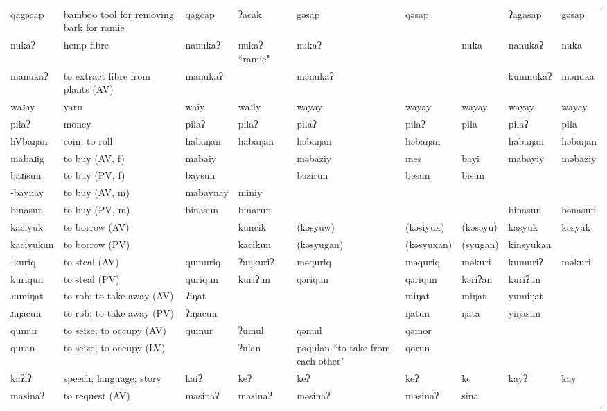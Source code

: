 \begin{landscape}
\begin{longtable}{*{9}{>{\raggedright\arraybackslash}p{}}}
\text{*}qagəcap & bamboo tool for removing bark for ramie & qagcap & ʔacak & gəsap & qəsap &  & ʔagasap & gəsap\\
\text{*}nukaʔ & hemp fibre & nanukaʔ & nukaʔ ``ramie" & nukaʔ &  & nuka & nanukaʔ & nuka\\
\text{*}manukaʔ & to extract fibre from plants (AV) & manukaʔ &  & mənukaʔ &  &  & kumnukaʔ & mənuka\\
\text{*}waɹay & yarn & waiy & waɹiy & wayay & wayay & wayay & wayay & wayay\\
\text{*}pilaʔ & money & pilaʔ & pilaʔ & pilaʔ & pilaʔ & pila & pilaʔ & pila\\
\text{*}hVbaŋan & coin; to roll & habaŋan & habaŋan & həbaŋan & həbaŋan &  & habaŋan & həbaŋan\\
\text{*}mabaɹig & to buy (AV, f) & mabaiy &  & məbaziy & mes & bayi & mabayiy & məbaziy\\
\text{*}baɹisun & to buy (PV, f) & baysun &  & bəzirun & besun & bisun &  & \\
\text{*}-baynay & to buy (AV, m) & mabaynay & miniy &  &  &  &  & \\
\text{*}binasun & to buy (PV, m) & binasun & binarun &  &  &  & binasun & bənasun\\
\text{*}kaciyuk & to borrow (AV) &  & kuncik & (kəsyuw) & (kəsiyux) & (kəsəyu) & kasyuk & kəsyuk\\
\text{*}kaciyukun & to borrow (PV) &  & kacikun & (kəsyugan) & (kəsyuxan) & (syugan) & kinsyukan & \\
\text{*}-kuriq & to steal (AV) & qumuriq & ʔuŋkuriʔ & məquriq & məquriq & məkuri & kumuriʔ & məkuri\\
\text{*}kuriqun & to steal (PV) & quriqun & kuriʔun & qəriqun & qəriqun & kəriʔan & kuriʔun & \\
\text{*}ɹumiŋat & to rob; to take away (AV) & ʔiŋat &  &  & miŋat & miŋat & yumiŋat & \\
\text{*}ɹiŋacun & to rob; to take away (PV) & ʔiŋacun &  &  & ŋatun & ŋata & yiŋasun & \\
\text{*}qumur & to seize; to occupy (AV) & qumur & ʔumul & qəmul & qəmor &  &  & \\
\text{*}quran & to seize; to occupy (LV) &  & ʔulan & pəqulan \newline ``to take from each other" & qorun &  &  & \\
\text{*}kaʔiʔ & speech; language; story & kaiʔ & keʔ & keʔ & keʔ & ke & kayʔ & kay\\
\text{*}masinaʔ & to request (AV) & masinaʔ & masinaʔ & məsinaʔ & məsinaʔ & sina &  & \\

\end{longtable}
\end{landscape}
